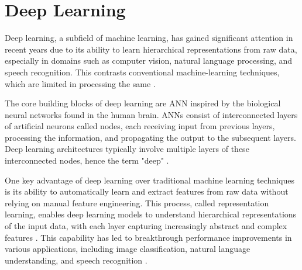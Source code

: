 \section{Deep Learning} 
Deep learning, a subfield of machine learning, has gained significant attention in recent years due to its ability to learn hierarchical representations from raw data, especially in domains such as computer vision, natural language processing, and speech recognition. This contrasts conventional machine-learning techniques, which are limited in processing the same \autocite{lecun2015deep}. 

The core building blocks of deep learning are \Gls{ANN} inspired by the biological neural networks found in the human brain. \glspl{ANN} consist of interconnected layers of artificial neurons called nodes, each receiving input from previous layers, processing the information, and propagating the output to the subsequent layers. Deep learning architectures typically involve multiple layers of these interconnected nodes, hence the term "deep" \autocite{goodfellow2016deep}.

One key advantage of deep learning over traditional machine learning techniques is its ability to automatically learn and extract features from raw data without relying on manual feature engineering. This process, called representation learning, enables deep learning models to understand hierarchical representations of the input data, with each layer capturing increasingly abstract and complex features \autocite{bengio2013representation}. This capability has led to breakthrough performance improvements in various applications, including image classification, natural language understanding, and speech recognition \autocite{krizhevsky2017imagenet}.